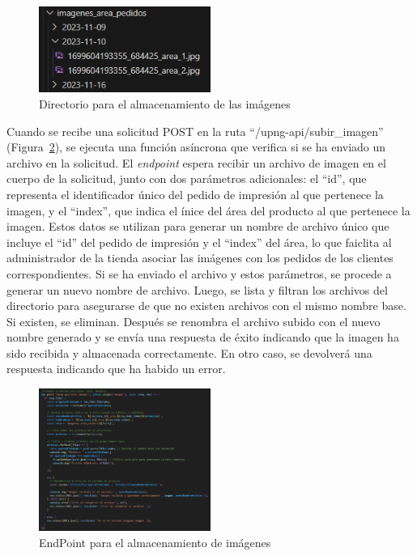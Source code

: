 \documentclass[12pt]{article}
\begin{document}
\begin{figure}[ht]
    \centering
    \includegraphics[width=0.5\textwidth]{imagenes-back/almacenamientoCarpetaImagenes.png}
    \caption{\label{fig:carpetaImagenes} Directorio para el almacenamiento de las imágenes }
    \vspace{\fill}
\end{figure}

Cuando se recibe una solicitud POST en la ruta ``/upng-api/subir\_imagen'' (Figura~\ref{fig:endpointImagen}), se ejecuta una función asíncrona que verifica si se ha enviado
un archivo en la solicitud. El \textit{endpoint} espera recibir un archivo de imagen en el cuerpo de la solicitud, junto con dos parámetros adicionales: el ``id'', que 
representa el identificador único del pedido de impresión al que pertenece la imagen, y el ``index'', que indica el ínice del área del producto al 
que pertenece la imagen. Estos datos se utilizan para generar un nombre de archivo único que incluye el ``id'' del pedido de impresión y el ``index'' del área,
lo que faiclita al administrador de la tienda asociar las imágenes con los pedidos de los clientes correspondientes. Si se ha enviado el archivo y estos parámetros, se procede a generar un nuevo nombre de archivo. Luego, se lista y filtran los archivos del directorio para asegurarse de que no existen
archivos con el mismo nombre base. Si existen, se eliminan. Después se renombra el archivo subido con el nuevo nombre generado y se envía una respuesta de éxito indicando
que la imagen ha sido recibida y almacenada correctamente. En otro caso, se devolverá una respuesta indicando que ha habido un error. 


\begin{figure}[ht]
    \centering
    \includegraphics[width=0.5\textwidth]{imagenes-back/endpointSubirImagen.png}
    \caption{\label{fig:endpointImagen} EndPoint para el almacenamiento de imágenes }
    \vspace{\fill}
\end{figure}
\end{document}
